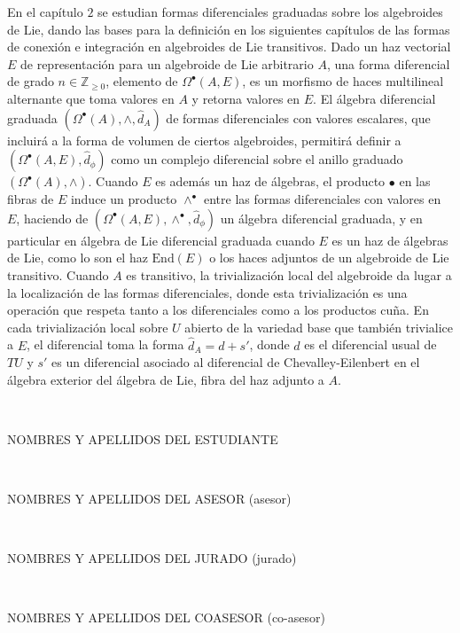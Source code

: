 \documentclass{article}
\begin{document}
En el capítulo $2$ se estudian formas diferenciales graduadas sobre los algebroides de Lie, dando las bases para la definición en los siguientes capítulos de las formas de conexión e integración en algebroides de Lie transitivos. Dado un haz vectorial $E$ de representación para un algebroide de Lie arbitrario $A$, una forma diferencial de grado $n \in \mathbb Z_{\geq 0}$, elemento de $\Omega^\bullet(A, E)$, es un morfismo de haces multilineal alternante que toma valores en $A$ y retorna valores en $E$. El álgebra diferencial graduada $(\Omega^\bullet(A), \wedge, \hat d_A)$ de formas diferenciales con valores escalares, que incluirá a la forma de volumen de ciertos algebroides, permitirá definir a $(\Omega^\bullet(A, E), \hat d_\phi)$ como un complejo diferencial sobre el anillo graduado $(\Omega^\bullet(A), \wedge)$. Cuando $E$ es además un haz de álgebras, el producto $\bullet$ en las fibras de $E$ induce un producto $\wedge^\bullet$ entre las formas diferenciales con valores en $E$, haciendo de $(\Omega^\bullet(A, E), \wedge^\bullet, \hat d_\phi)$ un álgebra diferencial graduada, y en particular en álgebra de Lie diferencial graduada cuando $E$ es un haz de álgebras de Lie, como lo son el haz $\text{End}(E)$ o los haces adjuntos de un algebroide de Lie transitivo. Cuando $A$ es transitivo, la trivialización local del algebroide da lugar a la localización de las formas diferenciales, donde esta trivialización es una operación que respeta tanto a los diferenciales como a los productos cuña. En cada trivialización local sobre $U$ abierto de la variedad base que también trivialice a $E$, el diferencial toma la forma $\hat d_A = d + s'$, donde $d$ es el diferencial usual de $TU$ y $s'$ es un diferencial asociado al diferencial de Chevalley-Eilenbert en el álgebra exterior del álgebra de Lie, fibra del haz adjunto a $A$.



\vspace{\fill}


\parbox{.4\textwidth}{%
\underline{\hspace{7cm}}\\
\raggedright NOMBRES Y APELLIDOS DEL ESTUDIANTE
}
\bigskip
\bigskip
\bigskip
\bigskip
\bigskip

\parbox{.4\textwidth}{%
\underline{\hspace{7cm}}\\
\raggedright NOMBRES Y APELLIDOS DEL ASESOR (asesor)
}
\hspace*{\fill}
\parbox{.4\textwidth}{%
\underline{\hspace{7cm}}\\
\raggedright NOMBRES Y APELLIDOS DEL JURADO (jurado)
}

\bigskip
\bigskip
\bigskip
\bigskip

\parbox{.4\textwidth}{%
\underline{\hspace{7cm}}\\
\raggedright NOMBRES Y APELLIDOS DEL COASESOR (co-asesor)
}
\end{document}
